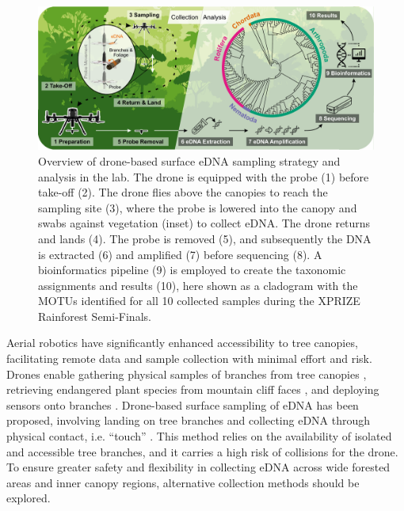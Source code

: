 \begin{figure}[tb]
    \centering
    \includegraphics[width=\linewidth]{chapters/papers/EP/figures/01_overview.pdf}
    
    \caption{Overview of drone-based surface \gls{eDNA} sampling strategy and analysis in the lab. The drone is equipped with the probe (1) before take-off (2). The drone flies above the canopies to reach the sampling site (3), where the probe is lowered into the canopy and swabs against vegetation (inset) to collect \gls{eDNA}. The drone returns and lands (4). The probe is removed (5), and subsequently the DNA is extracted (6) and amplified (7) before sequencing (8). A bioinformatics pipeline (9) is employed to create the taxonomic assignments and results (10), here shown as a cladogram with the \glspl{MOTU} identified for all 10 collected samples during the XPRIZE Rainforest Semi-Finals.}
    \label{fig:1-intro}
\end{figure}

Aerial robotics have significantly enhanced accessibility to tree canopies, facilitating remote data and sample collection with minimal effort and risk. Drones enable gathering physical samples of branches from tree canopies \cite{Charron2020}, retrieving endangered plant species from mountain cliff faces \cite{lavigne-2022}, and deploying sensors onto branches \cite{Geckeler2022, hamaza-2020}. Drone-based surface sampling of \gls{eDNA} has been proposed, involving landing on tree branches and collecting \gls{eDNA} through physical contact, i.e. “touch” \cite{eDrone}. This method relies on the availability of isolated and accessible tree branches, and it carries a high risk of collisions for the drone. To ensure greater safety and flexibility in collecting \gls{eDNA} across wide forested areas and inner canopy regions, alternative collection methods should be explored.

